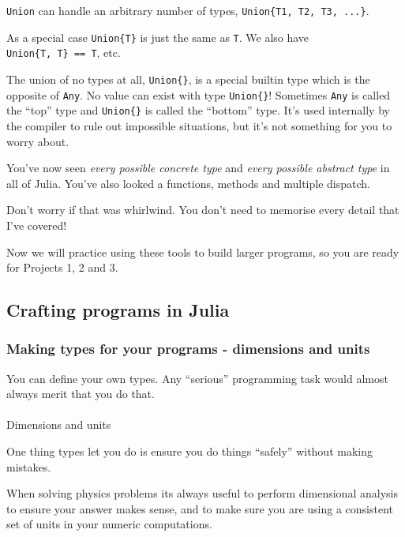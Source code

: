 \documentclass[
]{article}
\makeatletter
\let\oldparagraph\paragraph
\renewcommand{\paragraph}{
    \@ifstar
      \xxxParagraphStar
      \xxxParagraphNoStar
  }
\newcommand{\xxxParagraphStar}[1]{\oldparagraph*{#1}\mbox{}}
\newcommand{\xxxParagraphNoStar}[1]{\oldparagraph{#1}\mbox{}}
\makeatother
\begin{document}
\texttt{Union} can handle an arbitrary number of types,
\texttt{Union\{T1,\ T2,\ T3,\ ...\}}.

As a special case \texttt{Union\{T\}} is just the same as \texttt{T}. We
also have \texttt{Union\{T,\ T\}\ ==\ T}, etc.

The union of no types at all, \texttt{Union\{\}}, is a special builtin
type which is the opposite of \texttt{Any}. No value can exist with type
\texttt{Union\{\}}! Sometimes \texttt{Any} is called the ``top'' type
and \texttt{Union\{\}} is called the ``bottom'' type. It's used
internally by the compiler to rule out impossible situations, but it's
not something for you to worry about.

You've now seen \emph{every possible concrete type} and \emph{every
possible abstract type} in all of Julia. You've also looked a functions,
methods and multiple dispatch.

Don't worry if that was whirlwind. You don't need to memorise every
detail that I've covered!

Now we will practice using these tools to build larger programs, so you
are ready for Projects 1, 2 and 3.

\subsection{Crafting programs in
Julia}\label{crafting-programs-in-julia}

\subsubsection{Making types for your programs - dimensions and
units}\label{making-types-for-your-programs---dimensions-and-units}

You can define your own types. Any ``serious'' programming task would
almost always merit that you do that.

\paragraph{Dimensions and units}\label{dimensions-and-units}

One thing types let you do is ensure you do things ``safely'' without
making mistakes.

When solving physics problems its always useful to perform dimensional
analysis to ensure your answer makes sense, and to make sure you are
using a consistent set of units in your numeric computations.
\end{document}
